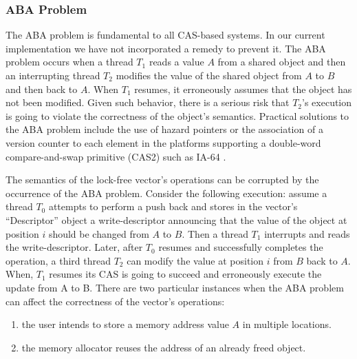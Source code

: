 \subsubsection{ABA Problem}

The ABA problem is fundamental to all CAS-based systems. In our
current implementation we have not incorporated a remedy to prevent
it. The ABA problem occurs when a thread $T_1$ reads a value $A$ from
a shared object and then an interrupting thread $T_2$ modifies the
value of the shared object from $A$ to $B$ and then back to $A$. When
$T_1$ resumes, it erroneously assumes that the object has not been
modified. Given such behavior, there is a serious risk that $T_2$'s
execution is going to violate the correctness of the object's
semantics. Practical solutions to the ABA problem include the use of
hazard pointers \cite{Michael2004} or the association of a version
counter to each element in the platforms supporting a double-word
compare-and-swap primitive (CAS2) such as IA-64 \cite{Intel2010}.

The semantics of the lock-free vector's operations can be corrupted by
the occurrence of the ABA problem. Consider the following execution:
assume a thread $T_0$ attempts to perform a push back and stores in
the vector's ``Descriptor'' object a write-descriptor announcing that
the value of the object at position $i$ should be changed from $A$ to
$B$. Then a thread $T_1$ interrupts and reads the
write-descriptor. Later, after $T_0$ resumes and successfully
completes the operation, a third thread $T_2$ can modify the value at
position $i$ from $B$ back to $A$. When, $T_1$ resumes its CAS is
going to succeed and erroneously execute the update from A to B. There
are two particular instances when the ABA problem can affect the
correctness of the vector's operations:

\begin{enumerate}
\item the user intends to store a memory address value $A$ in multiple
  locations.
\item the memory allocator reuses the address of an already freed
  object.
\end{enumerate}

